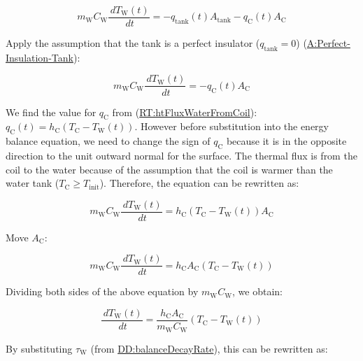 \documentclass[12pt]{article}
\begin{document}
\begin{displaymath}
m_\text{W} C_\text{W} \frac{\,dT_\text{W}(t)}{\,dt} = -{q_\text{tank}(t)} {A_\text{tank}} -{q_\text{C}(t)} {A_\text{C}}
\end{displaymath}

Apply the assumption that the tank is a perfect insulator ($q_\text{tank}=0$)
(\hyperref[assumpPIT]{A:Perfect-Insulation-Tank}): 

\begin{displaymath}
m_\text{W} C_\text{W} \frac{\,dT_\text{W}(t)}{\,dt} = -{q_\text{C}(t)} {A_\text{C}}
\end{displaymath}
        
We find the value for ${q_{\text{C}}}$ from
(\hyperref[RT:htFluxWaterFromCoil]{RT:htFluxWaterFromCoil}):
${q_{\text{C}}(t)}={h_{\text{C}}}
\left({T_{\text{C}}}-{T_{\text{W}}}\left(t\right)\right)$.  However before
substitution into the energy balance equation, we need to change the sign of
${q_{\text{C}}}$ because it is in the opposite direction to the unit outward
normal for the surface.  The thermal flux is from the coil to the water because
of the assumption that the coil is warmer than the water tank ($T_\text{C} \geq
T_\text{init}$).  Therefore, the equation can be rewritten as:

\begin{displaymath}
m_\text{W} C_\text{W} \frac{\,dT_\text{W}(t)}{\,dt} = {h_{\text{C}}}
\left({T_{\text{C}}}-{T_{\text{W}}}\left(t\right)\right) {A_\text{C}}
\end{displaymath}
        
Move $A_\text{C}$:

\begin{displaymath}
m_\text{W} C_\text{W} \frac{\,dT_\text{W}(t)}{\,dt} = {h_{\text{C}}} {A_\text{C}}
\left({T_{\text{C}}}-{T_{\text{W}}}\left(t\right)\right) 
\end{displaymath}
        
Dividing both sides of the above equation by ${m_{\text{W}}} {C_{\text{W}}}$, we
obtain:

\begin{displaymath}
\frac{\,d{T_{\text{W}}}(t)}{\,dt}=\frac{{h_{\text{C}}} {A_{\text{C}}}}{{m_{\text{W}}} {C_{\text{W}}}} \left({T_{\text{C}}}-{T_{\text{W}}(t)}\right)
\end{displaymath}

By substituting ${τ_{\text{W}}}$ (from \hyperref[DD:balanceDecayRate]{DD:balanceDecayRate}), this can be rewritten as:
\end{document}
